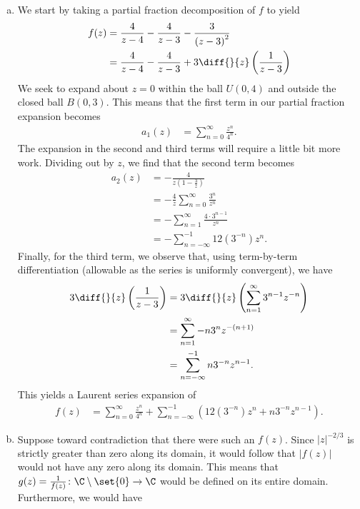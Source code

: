 \documentclass[10pt]{mypackage}
\begin{document}
\begin{solution}\hfill
  \begin{enumerate}[(a)]
    \item We start by taking a partial fraction decomposition of $f$ to yield
      \begin{align*}
        f(z) &= \frac{4}{z-4} - \frac{4}{z-3} -\frac{3}{\left( z-3 \right)^2}\\
             &= \frac{4}{z-4} - \frac{4}{z-3} + 3 \diff{}{z}\left( \frac{1}{z-3} \right) 
      \end{align*}
      We seek to expand about $z = 0$ within the ball $U\left( 0,4 \right)$ and outside the closed ball $B\left( 0,3 \right)$. This means that the first term in our partial fraction expansion becomes
      \begin{align*}
        a_1(z) &= \sum_{n=0}^{\infty} \frac{z^{n}}{4^{n}}.
      \end{align*}
      The expansion in the second and third terms will require a little bit more work. Dividing out by $z$, we find that the second term becomes
      \begin{align*}
        a_2(z) &= -\frac{4}{z\left( 1-\frac{3}{z} \right)}\\
               &= -\frac{4}{z} \sum_{n=0}^{\infty} \frac{3^{n}}{z^{n}}\\
               &= -\sum_{n=1}^{\infty}\frac{4\cdot 3^{n-1}}{z^{n}}\\
               &= -\sum_{n=-\infty}^{-1}12\left( 3^{-n} \right) z^{n}.
      \end{align*}
      Finally, for the third term, we observe that, using term-by-term differentiation (allowable as the series is uniformly convergent), we have
      \begin{align*}
        3\diff{}{z}\left( \frac{1}{z-3} \right) &= 3\diff{}{z}\left( \sum_{n=1}^{\infty} 3^{n-1}z^{-n} \right)\\
                                                &= \sum_{n=1}^{\infty} -n3^{n}z^{-\left( n+1 \right)}\\
                                                &= \sum_{n=-\infty}^{-1} n3^{-n}z^{n-1}.
      \end{align*}
      This yields a Laurent series expansion of
      \begin{align*}
        f(z) &= \sum_{n=0}^{\infty} \frac{z^{n}}{4^{n}} + \sum_{n=-\infty}^{-1} \left( 12\left( 3^{-n} \right)z^{n} + n3^{-n}z^{n-1} \right).
      \end{align*}
    \item Suppose toward contradiction that there were such an $f(z)$. Since $\left\vert z \right\vert^{-2/3}$ is strictly greater than zero along its domain, it would follow that $\left\vert f(z) \right\vert$ would not have any zero along its domain. This means that $ g(z) = \frac{1}{f(z)}\colon\C\setminus \set{0}\rightarrow\C $ would be defined on its entire domain. Furthermore, we would have

\end{enumerate}
\end{solution}
\end{document}
